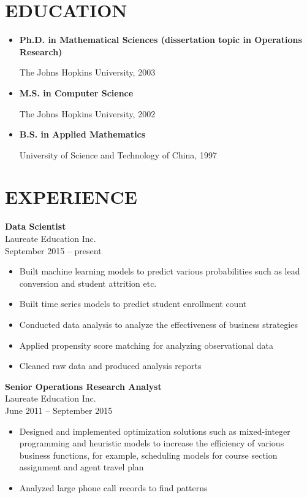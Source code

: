 \documentclass[11pt]{res} %
\begin{document}
\begin{resume}
                                               
 
\section{EDUCATION} 
\begin{itemize} \itemsep -2pt
	\item {\bf Ph.D. in Mathematical Sciences (dissertation topic in Operations Research)}

	The Johns Hopkins University, 2003
	\item {\bf M.S. in Computer Science}

	The Johns Hopkins University, 2002
	\item {\bf B.S. in Applied Mathematics}

	University of Science and Technology of China, 1997
\end{itemize}

 
\section{EXPERIENCE} 
{\bf Data Scientist} \\
Laureate Education Inc.\\
September 2015 -- present 
\vspace{0.05in}
   \begin{itemize} \itemsep -2pt  %
   \item Built machine learning models to predict various probabilities such as lead conversion and student attrition etc.
	 \item Built time series models to predict student enrollment count
	 \item Conducted  data analysis to analyze the effectiveness of business strategies
	 \item Applied propensity score matching for analyzing observational data
	 \item Cleaned raw data and produced analysis reports
\end{itemize}
{\bf Senior Operations Research Analyst}\\
Laureate Education Inc. \\
June 2011 -- September 2015
\vspace{0.05in}
\begin{itemize} \itemsep -2pt
	 \item Designed and implemented optimization solutions such as mixed-integer programming and heuristic models to increase the efficiency of various business functions, for example, scheduling models for course section assignment and agent travel plan
	 \item Analyzed large phone call records to find patterns
 \end{itemize}


\end{resume}
\end{document}
